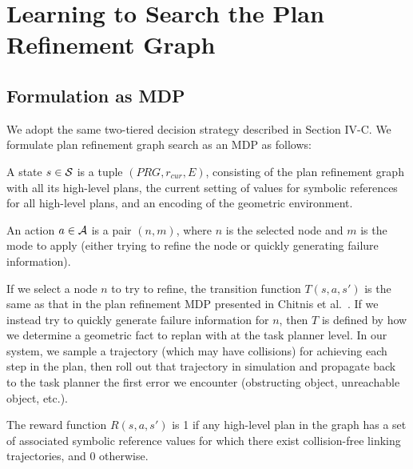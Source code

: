 \section{Learning to Search the Plan Refinement Graph}
\subsection{Formulation as MDP}
We adopt the same two-tiered decision strategy described in Section IV-C.
We formulate plan refinement graph search as an MDP as follows:
\begin{tightlist}
\item A state $s \in \mathcal{S}$ is a tuple $(PRG, r_{cur}, E)$, consisting of the
plan refinement graph with all its high-level plans, the current setting of
values for symbolic references for all high-level plans, and
an encoding of the geometric environment.
\item An action $a \in \mathcal{A}$ is a pair $(n, m)$, where $n$ is the selected node and $m$ is
the mode to apply (either trying to refine the node or quickly generating failure information).
\item If we select a node $n$ to try to refine, the transition function $T(s, a, s')$ is the same
as that in the plan refinement MDP presented in Chitnis et al.~\cite{chitnis2015mlpc}. If we instead
try to quickly generate failure information for $n$, then $T$ is defined by how we determine a geometric
fact to replan with at the task planner level. In our system, we sample a trajectory (which may have
collisions) for achieving each step in the plan, then roll out that trajectory in simulation and propagate
back to the task planner the first error we encounter (obstructing object, unreachable object, etc.).
\item The reward function $R(s, a, s')$ is 1 if any high-level plan in the graph has
a set of associated symbolic reference values for which there exist collision-free linking
trajectories, and 0 otherwise.
\end{tightlist}

